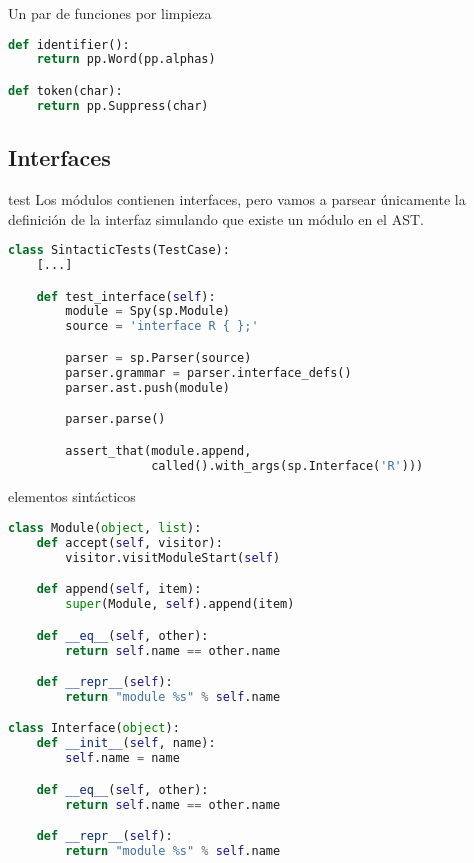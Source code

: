 \documentclass[11pt]{beamer}
\begin{document}
\begin{frame}[fragile]{Un par de funciones por limpieza}
\begin{lstlisting}[language=Python]
def identifier():
    return pp.Word(pp.alphas)

def token(char):
    return pp.Suppress(char)
\end{lstlisting}
\end{frame}


\subsection{Interfaces}

\begin{frame}[fragile]{test}
  Los módulos contienen interfaces, pero vamos a parsear únicamente la definición de la
  interfaz simulando que existe un módulo en el AST.

\begin{lstlisting}[language=Python]
class SintacticTests(TestCase):
    [...]

    def test_interface(self):
        module = Spy(sp.Module)
        source = 'interface R { };'

        parser = sp.Parser(source)
        parser.grammar = parser.interface_defs()
        parser.ast.push(module)

        parser.parse()

        assert_that(module.append,
                    called().with_args(sp.Interface('R')))
\end{lstlisting}
\end{frame}


\begin{frame}[fragile]{elementos sintácticos}
\begin{lstlisting}[language=Python, basicstyle = \tiny\lstfont]
class Module(object, list):
    def accept(self, visitor):
        visitor.visitModuleStart(self)

    def append(self, item):
        super(Module, self).append(item)

    def __eq__(self, other):
        return self.name == other.name

    def __repr__(self):
        return "module %s" % self.name

class Interface(object):
    def __init__(self, name):
        self.name = name

    def __eq__(self, other):
        return self.name == other.name

    def __repr__(self):
        return "module %s" % self.name
\end{lstlisting}
\end{frame}
\end{document}
